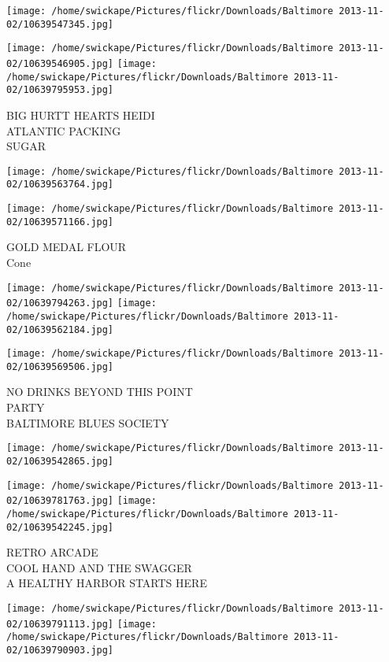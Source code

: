 \documentclass[10pt,letterpaper]{article}
\begin{document}
\texttt{[image: /home/swickape/Pictures/flickr/Downloads/Baltimore 2013-11-02/10639547345.jpg]}

\vspace{0.25in}
\texttt{[image: /home/swickape/Pictures/flickr/Downloads/Baltimore 2013-11-02/10639546905.jpg]}
\texttt{[image: /home/swickape/Pictures/flickr/Downloads/Baltimore 2013-11-02/10639795953.jpg]}

BIG HURTT HEARTS HEIDI\\
ATLANTIC PACKING\\
SUGAR
\pagebreak

\texttt{[image: /home/swickape/Pictures/flickr/Downloads/Baltimore 2013-11-02/10639563764.jpg]}

\vspace{0.25in}
\texttt{[image: /home/swickape/Pictures/flickr/Downloads/Baltimore 2013-11-02/10639571166.jpg]}

GOLD MEDAL FLOUR\\
Cone
\pagebreak

\texttt{[image: /home/swickape/Pictures/flickr/Downloads/Baltimore 2013-11-02/10639794263.jpg]}
\texttt{[image: /home/swickape/Pictures/flickr/Downloads/Baltimore 2013-11-02/10639562184.jpg]}

\texttt{[image: /home/swickape/Pictures/flickr/Downloads/Baltimore 2013-11-02/10639569506.jpg]}

NO DRINKS BEYOND THIS POINT\\
PARTY\\
BALTIMORE BLUES SOCIETY
\pagebreak

\texttt{[image: /home/swickape/Pictures/flickr/Downloads/Baltimore 2013-11-02/10639542865.jpg]}

\vspace{0.25in}
\texttt{[image: /home/swickape/Pictures/flickr/Downloads/Baltimore 2013-11-02/10639781763.jpg]}
\texttt{[image: /home/swickape/Pictures/flickr/Downloads/Baltimore 2013-11-02/10639542245.jpg]}

RETRO ARCADE\\
COOL HAND AND THE SWAGGER\\
A HEALTHY HARBOR STARTS HERE
\pagebreak

\texttt{[image: /home/swickape/Pictures/flickr/Downloads/Baltimore 2013-11-02/10639791113.jpg]}
\texttt{[image: /home/swickape/Pictures/flickr/Downloads/Baltimore 2013-11-02/10639790903.jpg]}
\end{document}
